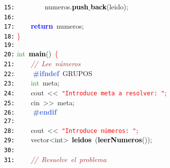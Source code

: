 \documentclass[a4paper,10pt]{scrartcl}
\begin{document}
{   \mbox{}\texttt{\textcolor{Black}{15:}} \ \ \ \ \ \ \ \ numeros\textcolor{BrickRed}{.}\textbf{\textcolor{Black}{push$\_$back}}\textcolor{BrickRed}{(}leido\textcolor{BrickRed}{);} \\
   \mbox{}\texttt{\textcolor{Black}{16:}} \ \ \ \  \\
   \mbox{}\texttt{\textcolor{Black}{17:}} \ \ \ \ \textbf{\textcolor{Blue}{return}}\ numeros\textcolor{BrickRed}{;} \\
   \mbox{}\texttt{\textcolor{Black}{18:}} \textcolor{Red}{\}} \\
   \mbox{}\texttt{\textcolor{Black}{19:}}  \\
   \mbox{}\texttt{\textcolor{Black}{20:}} \textcolor{ForestGreen}{int}\ \textbf{\textcolor{Black}{main}}\textcolor{BrickRed}{()}\ \textcolor{Red}{\{} \\
   \mbox{}\texttt{\textcolor{Black}{21:}} \ \ \ \ \textit{\textcolor{Brown}{//\ Lee\ números}} \\
   \mbox{}\texttt{\textcolor{Black}{22:}} \textbf{\textcolor{RoyalBlue}{\ \ \ \ \#ifndef}}\ GRUPOS \\
   \mbox{}\texttt{\textcolor{Black}{23:}} \ \ \ \ \textcolor{ForestGreen}{int}\ meta\textcolor{BrickRed}{;} \\
   \mbox{}\texttt{\textcolor{Black}{24:}} \ \ \ \ cout\ \textcolor{BrickRed}{\textless{}\textless{}}\ \texttt{\textcolor{Red}{"{}Introduce\ meta\ a\ resolver:\ "{}}}\textcolor{BrickRed}{;} \\
   \mbox{}\texttt{\textcolor{Black}{25:}} \ \ \ \ cin\ \textcolor{BrickRed}{\textgreater{}\textgreater{}}\ meta\textcolor{BrickRed}{;} \\
   \mbox{}\texttt{\textcolor{Black}{26:}} \textbf{\textcolor{RoyalBlue}{\ \ \ \ \#endif}} \\
   \mbox{}\texttt{\textcolor{Black}{27:}}  \\
   \mbox{}\texttt{\textcolor{Black}{28:}} \ \ \ \ cout\ \textcolor{BrickRed}{\textless{}\textless{}}\ \texttt{\textcolor{Red}{"{}Introduce\ números:\ "{}}}\textcolor{BrickRed}{;} \\
   \mbox{}\texttt{\textcolor{Black}{29:}} \ \ \ \ \textcolor{TealBlue}{vector\textless{}int\textgreater{}}\ \textbf{\textcolor{Black}{leidos}}\ \textcolor{BrickRed}{(}\textbf{\textcolor{Black}{leerNumeros}}\textcolor{BrickRed}{());} \\
   \mbox{}\texttt{\textcolor{Black}{30:}} \ \ \ \  \\
   \mbox{}\texttt{\textcolor{Black}{31:}} \ \ \ \ \textit{\textcolor{Brown}{//\ Resuelve\ el\ problema}} \\
}
\end{document}
